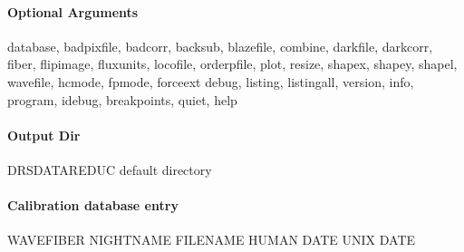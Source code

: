 \documentclass[a4paper,10pt,english]{report}
\begin{document}
\paragraph{Optional Arguments}
\label{\detokenize{user/spirou/recipes/wave_local:optional-arguments}}
\begin{sphinxVerbatim}[commandchars=\\\{\}]
\PYGZhy{}\PYGZhy{}database, \PYGZhy{}\PYGZhy{}badpixfile, \PYGZhy{}\PYGZhy{}badcorr, \PYGZhy{}\PYGZhy{}backsub, \PYGZhy{}\PYGZhy{}blazefile,
\PYGZhy{}\PYGZhy{}combine, \PYGZhy{}\PYGZhy{}darkfile, \PYGZhy{}\PYGZhy{}darkcorr,  \PYGZhy{}\PYGZhy{}fiber, \PYGZhy{}\PYGZhy{}flipimage,
\PYGZhy{}\PYGZhy{}fluxunits,  \PYGZhy{}\PYGZhy{}locofile, \PYGZhy{}\PYGZhy{}orderpfile, \PYGZhy{}\PYGZhy{}plot, \PYGZhy{}\PYGZhy{}resize,
\PYGZhy{}\PYGZhy{}shapex, \PYGZhy{}\PYGZhy{}shapey, \PYGZhy{}\PYGZhy{}shapel, \PYGZhy{}\PYGZhy{}wavefile, \PYGZhy{}hcmode, \PYGZhy{}fpmode,
\PYGZhy{}\PYGZhy{}forceext
\PYGZhy{}\PYGZhy{}debug, \PYGZhy{}\PYGZhy{}listing, \PYGZhy{}\PYGZhy{}listingall, \PYGZhy{}\PYGZhy{}version, \PYGZhy{}\PYGZhy{}info,
\PYGZhy{}\PYGZhy{}program, \PYGZhy{}\PYGZhy{}idebug, \PYGZhy{}\PYGZhy{}breakpoints, \PYGZhy{}\PYGZhy{}quiet, \PYGZhy{}\PYGZhy{}help
\end{sphinxVerbatim}


\paragraph{Output Dir}
\label{\detokenize{user/spirou/recipes/wave_local:output-dir}}
\begin{sphinxVerbatim}[commandchars=\\\{\}]
DRS\PYGZus{}DATA\PYGZus{}REDUC    default  directory
\end{sphinxVerbatim}


\paragraph{Calibration database entry}
\label{\detokenize{user/spirou/recipes/wave_local:calibration-database-entry}}
\begin{sphinxVerbatim}[commandchars=\\\{\}]
WAVE\PYGZus{}FIBER NIGHT\PYGZus{}NAME FILENAME HUMAN DATE UNIX DATE
\end{sphinxVerbatim}
\end{document}
